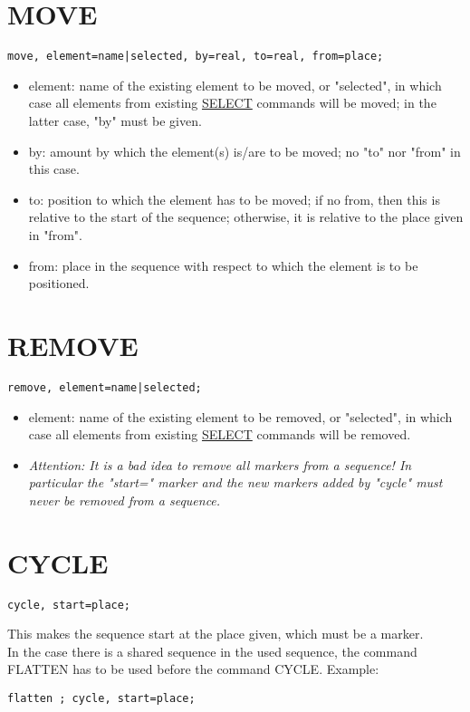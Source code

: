 \section{MOVE}
\begin{verbatim}
move, element=name|selected, by=real, to=real, from=place;
\end{verbatim}
\begin{itemize}
   \item element: name of the existing element to be moved, or
     "selected", in which case all elements from existing
     \href{../Introduction/select.html}{SELECT} commands will be moved;
     in the latter case, "by" must be given.  
   \item by: amount by which the element(s) is/are to be moved; no "to"
     nor "from" in this case.  
   \item to: position to which the element has to be moved; if no from,
     then this is relative to the start of the sequence; otherwise, it
     is relative to the place given in "from".  
   \item from: place in the sequence with respect to which the element
     is to be positioned.  
\end{itemize}

\section{REMOVE}
\begin{verbatim}
remove, element=name|selected;
\end{verbatim}
\begin{itemize}
   \item element: name of the existing element to be removed, or
     "selected", in which case all elements from existing
     \href{../Introduction/select.html}{SELECT} commands will be
     removed. 
   \item \textit{Attention: It is a bad idea to remove all markers from
     a sequence! In particular the "start=" marker and the new markers
     added by "cycle" must never be removed from a sequence.} 
\end{itemize}

\section{CYCLE}
\begin{verbatim}
cycle, start=place;
\end{verbatim} 
This makes the sequence start at the place given, which must be a
marker. \\ 
In the case there is a shared sequence in the used sequence, the
command FLATTEN has to be used before the command CYCLE. Example:  
\begin{verbatim}
flatten ; cycle, start=place; 
\end{verbatim}

